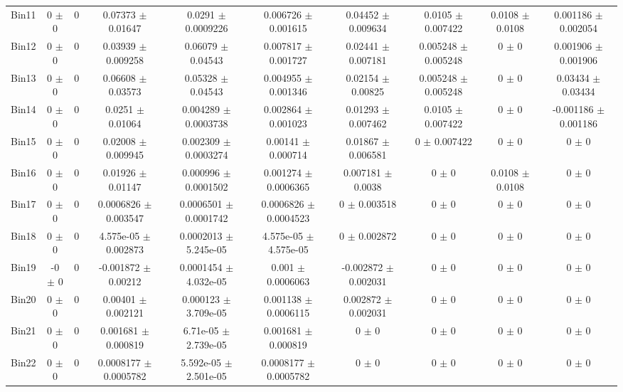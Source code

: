 \begin{tabular}{@{\extracolsep{4pt}}lccccccccc@{}}
     Bin11 & 0 $\pm$ 0 & 0 & 0.07373 $\pm$ 0.01647 & 0.0291 $\pm$ 0.0009226 & 0.006726 $\pm$ 0.001615 & 0.04452 $\pm$ 0.009634 & 0.0105 $\pm$ 0.007422 & 0.0108 $\pm$ 0.0108 & 0.001186 $\pm$ 0.002054 \\ 
     Bin12 & 0 $\pm$ 0 & 0 & 0.03939 $\pm$ 0.009258 & 0.06079 $\pm$ 0.04543 & 0.007817 $\pm$ 0.001727 & 0.02441 $\pm$ 0.007181 & 0.005248 $\pm$ 0.005248 & 0 $\pm$ 0 & 0.001906 $\pm$ 0.001906 \\ 
     Bin13 & 0 $\pm$ 0 & 0 & 0.06608 $\pm$ 0.03573 & 0.05328 $\pm$ 0.04543 & 0.004955 $\pm$ 0.001346 & 0.02154 $\pm$ 0.00825 & 0.005248 $\pm$ 0.005248 & 0 $\pm$ 0 & 0.03434 $\pm$ 0.03434 \\ 
     Bin14 & 0 $\pm$ 0 & 0 & 0.0251 $\pm$ 0.01064 & 0.004289 $\pm$ 0.0003738 & 0.002864 $\pm$ 0.001023 & 0.01293 $\pm$ 0.007462 & 0.0105 $\pm$ 0.007422 & 0 $\pm$ 0 & -0.001186 $\pm$ 0.001186 \\ 
     Bin15 & 0 $\pm$ 0 & 0 & 0.02008 $\pm$ 0.009945 & 0.002309 $\pm$ 0.0003274 & 0.00141 $\pm$ 0.000714 & 0.01867 $\pm$ 0.006581 & 0 $\pm$ 0.007422 & 0 $\pm$ 0 & 0 $\pm$ 0 \\ 
     Bin16 & 0 $\pm$ 0 & 0 & 0.01926 $\pm$ 0.01147 & 0.000996 $\pm$ 0.0001502 & 0.001274 $\pm$ 0.0006365 & 0.007181 $\pm$ 0.0038 & 0 $\pm$ 0 & 0.0108 $\pm$ 0.0108 & 0 $\pm$ 0 \\ 
     Bin17 & 0 $\pm$ 0 & 0 & 0.0006826 $\pm$ 0.003547 & 0.0006501 $\pm$ 0.0001742 & 0.0006826 $\pm$ 0.0004523 & 0 $\pm$ 0.003518 & 0 $\pm$ 0 & 0 $\pm$ 0 & 0 $\pm$ 0 \\ 
     Bin18 & 0 $\pm$ 0 & 0 & 4.575e-05 $\pm$ 0.002873 & 0.0002013 $\pm$ 5.245e-05 & 4.575e-05 $\pm$ 4.575e-05 & 0 $\pm$ 0.002872 & 0 $\pm$ 0 & 0 $\pm$ 0 & 0 $\pm$ 0 \\ 
     Bin19 & -0 $\pm$ 0 & 0 & -0.001872 $\pm$ 0.00212 & 0.0001454 $\pm$ 4.032e-05 & 0.001 $\pm$ 0.0006063 & -0.002872 $\pm$ 0.002031 & 0 $\pm$ 0 & 0 $\pm$ 0 & 0 $\pm$ 0 \\ 
     Bin20 & 0 $\pm$ 0 & 0 & 0.00401 $\pm$ 0.002121 & 0.000123 $\pm$ 3.709e-05 & 0.001138 $\pm$ 0.0006115 & 0.002872 $\pm$ 0.002031 & 0 $\pm$ 0 & 0 $\pm$ 0 & 0 $\pm$ 0 \\ 
     Bin21 & 0 $\pm$ 0 & 0 & 0.001681 $\pm$ 0.000819 & 6.71e-05 $\pm$ 2.739e-05 & 0.001681 $\pm$ 0.000819 & 0 $\pm$ 0 & 0 $\pm$ 0 & 0 $\pm$ 0 & 0 $\pm$ 0 \\ 
     Bin22 & 0 $\pm$ 0 & 0 & 0.0008177 $\pm$ 0.0005782 & 5.592e-05 $\pm$ 2.501e-05 & 0.0008177 $\pm$ 0.0005782 & 0 $\pm$ 0 & 0 $\pm$ 0 & 0 $\pm$ 0 & 0 $\pm$ 0 \\ 

\end{tabular}
